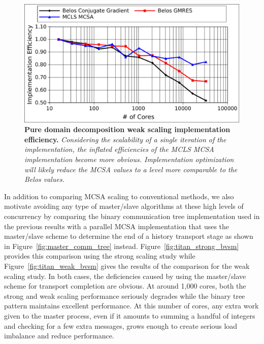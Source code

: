 \begin{figure}[t!]
  \begin{center}
    \includegraphics[width=6in]{chapters/parallel_mc/titan_weak_implementation.pdf}
  \end{center}
  \caption{\textbf{Pure domain decomposition weak scaling
      implementation efficiency.} \textit{Considering the scalability
      of a single iteration of the implementation, the inflated
      efficiencies of the MCLS MCSA implementation become more
      obvious. Implementation optimization will likely reduce the MCSA
      values to a level more comparable to the Belos values.}}
  \label{fig:titan_weak_implementation}
\end{figure}

In addition to comparing MCSA scaling to conventional methods, we also
motivate avoiding any type of master/slave algorithms at these high
levels of concurrency by comparing the binary communication tree
implementation used in the previous results with a parallel MCSA
implementation that uses the master/slave scheme to determine the end
of a history transport stage as shown in
Figure~\ref{fig:master_comm_tree}
instead. Figure~\ref{fig:titan_strong_bvsm} provides this comparison
using the strong scaling study while Figure~\ref{fig:titan_weak_bvsm}
gives the results of the comparison for the weak scaling study. In
both cases, the deficiencies caused by using the master/slave scheme
for transport completion are obvious. At around 1,000 cores, both the
strong and weak scaling performance seriously degrades while the
binary tree pattern maintains excellent performance. At this number of
cores, any extra work given to the master process, even if it amounts
to summing a handful of integers and checking for a few extra
messages, grows enough to create serious load imbalance and reduce
performance.

